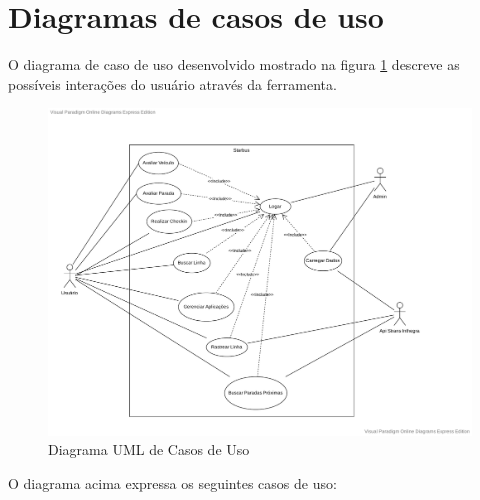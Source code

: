 \section{Diagramas de casos de uso} \label{sec:modelagem:casos}

O diagrama de caso de uso desenvolvido mostrado na figura \ref{fig:uml_caso_uso} descreve as possíveis interações do usuário através da ferramenta.

\begin{figure}[H]
  \caption{\label{fig:uml_caso_uso}Diagrama UML de Casos de Uso}
  \centering
  \includegraphics[scale=0.7]{imagens/usecase-sb.pdf}
\end{figure}

O diagrama acima expressa os seguintes casos de uso:

